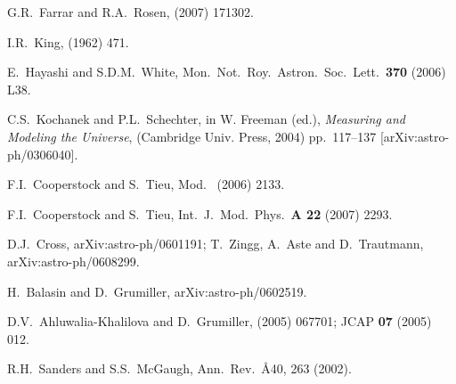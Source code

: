 \documentclass[12pt]{iopart}
\begin{document}
\begin{thebibliography}{66}
G.R.~Farrar and R.A.~Rosen,
 (2007) 171302. %

I.R.~King,
 (1962) 471.

E.~Hayashi and S.D.M.~White,
Mon.\ Not.\ Roy.\ Astron.\ Soc.\ Lett.\ {\bf370} (2006) L38.

C.S.~Kochanek and P.L.~Schechter,
in W. Freeman (ed.), {\it Measuring and Modeling the Universe},
(Cambridge Univ. Press, 2004) pp.\ 117--137
[arXiv:astro-ph/0306040].

F.I.~Cooperstock and S.~Tieu,
Mod.\  (2006) 2133.

F.I.~Cooperstock and S.~Tieu,
Int.\ J.\ Mod.\ Phys.\ {\bf A 22} (2007) 2293. %

D.J.~Cross,
arXiv:astro-ph/0601191;
T.~Zingg, A.~Aste and D.~Trautmann,
arXiv:astro-ph/0608299.

H.~Balasin and D.~Grumiller,
arXiv:astro-ph/0602519.

D.V.~Ahluwalia-Khalilova and D.~Grumiller,
 (2005) 067701; %
JCAP {\bf07} (2005) 012. %

R.H.~Sanders and S.S.~McGaugh,
Ann.\ Rev.\ \AA{40}, 263 (2002).


\end{thebibliography}
\end{document}
